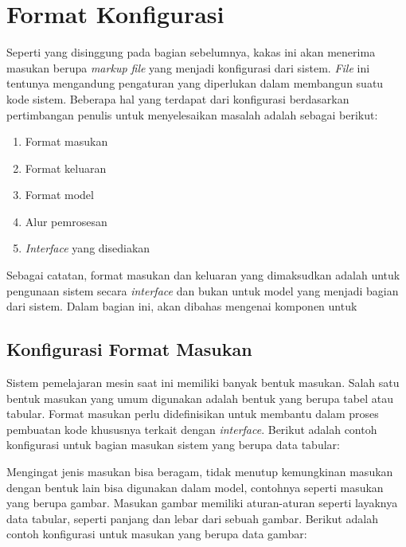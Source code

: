 \section{Format Konfigurasi}

Seperti yang disinggung pada bagian sebelumnya, kakas ini akan menerima masukan berupa \textit{markup file} yang menjadi konfigurasi dari sistem.
\textit{File} ini tentunya mengandung pengaturan yang diperlukan dalam membangun suatu kode sistem.
Beberapa hal yang terdapat dari konfigurasi berdasarkan pertimbangan penulis untuk menyelesaikan masalah adalah sebagai berikut:

\begin{enumerate}
	\item Format masukan
	\item Format keluaran
	\item Format model
	\item Alur pemrosesan
	\item \textit{Interface} yang disediakan
\end{enumerate}

Sebagai catatan, format masukan dan keluaran yang dimaksudkan adalah untuk pengunaan sistem secara \textit{interface} dan bukan untuk model yang menjadi bagian dari sistem.
Dalam bagian ini, akan dibahas mengenai komponen untuk 

\subsection{Konfigurasi Format Masukan}

Sistem pemelajaran mesin saat ini memiliki banyak bentuk masukan.
Salah satu bentuk masukan yang umum digunakan adalah bentuk yang berupa tabel atau tabular.
Format masukan perlu didefinisikan untuk membantu dalam proses pembuatan kode khususnya terkait dengan \textit{interface}.
Berikut adalah contoh konfigurasi untuk bagian masukan sistem yang berupa data tabular:


Mengingat jenis masukan bisa beragam, tidak menutup kemungkinan masukan dengan bentuk lain bisa digunakan dalam model, contohnya seperti masukan yang berupa gambar.
Masukan gambar memiliki aturan-aturan seperti layaknya data tabular, seperti panjang dan lebar dari sebuah gambar.
Berikut adalah contoh konfigurasi untuk masukan yang berupa data gambar:


